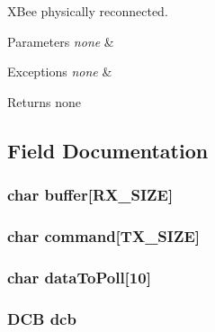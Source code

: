 X\-Bee physically reconnected. 


\begin{DoxyParams}{Parameters}
{\em none} & \\
\hline
\end{DoxyParams}

\begin{DoxyExceptions}{Exceptions}
{\em none} & \\
\hline
\end{DoxyExceptions}
\begin{DoxyReturn}{Returns}
none 
\end{DoxyReturn}


\subsection{Field Documentation}
\hypertarget{a00002_a9bfec7969db289b67014513bcabba47f}{
\subsubsection[{buffer}]{\setlength{\rightskip}{0pt plus 5cm}char buffer\mbox{[}R\-X\-\_\-\-S\-I\-Z\-E\mbox{]}\hspace{0.3cm}{\ttfamily [private]}}}\label{a00002_a9bfec7969db289b67014513bcabba47f}
\hypertarget{a00002_a8e3c3dbe1da8cc4b648ab2a6d7ddb7c5}{
\subsubsection[{command}]{\setlength{\rightskip}{0pt plus 5cm}char command\mbox{[}T\-X\-\_\-\-S\-I\-Z\-E\mbox{]}\hspace{0.3cm}{\ttfamily [private]}}}\label{a00002_a8e3c3dbe1da8cc4b648ab2a6d7ddb7c5}
\hypertarget{a00002_a581ac8ca710cda078fd8ddb8e50954eb}{
\subsubsection[{data\-To\-Poll}]{\setlength{\rightskip}{0pt plus 5cm}char data\-To\-Poll\mbox{[}10\mbox{]}\hspace{0.3cm}{\ttfamily [private]}}}\label{a00002_a581ac8ca710cda078fd8ddb8e50954eb}
\hypertarget{a00002_a9954a8d34e6014302ae1d99cf5714cc9}{
\subsubsection[{dcb}]{\setlength{\rightskip}{0pt plus 5cm}D\-C\-B dcb\hspace{0.3cm}{\ttfamily [private]}}}\label{a00002_a9954a8d34e6014302ae1d99cf5714cc9}
